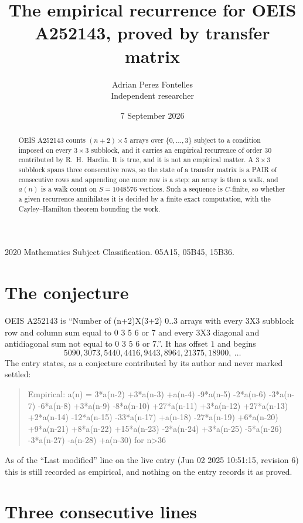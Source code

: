 \documentclass[11pt,a4paper]{article}
\title{The empirical recurrence for OEIS A252143, proved by transfer matrix}
\author{Adrian Perez Fontelles\\ \small Independent researcher}
\date{7 September 2026}
\theoremstyle{plain}
\theoremstyle{definition}
\begin{document}
\maketitle

\begin{abstract}
OEIS A252143 counts $(n+2)\times5$ arrays over $\{0,\dots,3\}$ subject to a condition imposed on
every $3\times3$ subblock, and it carries an empirical recurrence of order $30$
contributed by R.~H.~Hardin. It is true, and it is not an empirical matter. A $3\times3$
subblock spans three consecutive rows, so the state of a transfer matrix is a PAIR of
consecutive rows and appending one more row is a step; an array is then a walk, and
$a(n)$ is a walk count on $S=1048576$ vertices. Such a sequence is $C$-finite, so whether a given
recurrence annihilates it is decided by a finite exact computation, with the Cayley--Hamilton
theorem bounding the work.
\end{abstract}

\noindent\small 2020 Mathematics Subject Classification. 05A15, 05B45, 15B36.\normalsize

\section{The conjecture}

OEIS A252143 is ``Number of (n+2)X(3+2) 0..3 arrays with every 3X3 subblock row and column sum equal to 0 3 5 6 or 7 and every 3X3 diagonal and antidiagonal sum not equal to 0 3 5 6 or 7.''. It has offset $1$ and begins
\[
5090, 3073, 5440, 4416, 9443, 8964, 21375, 18900,\ \dots
\]
The entry states, as a conjecture contributed by its author and never marked settled:
\begin{quote}
Empirical: a(n) = 3*a(n-2) +3*a(n-3) +a(n-4) -9*a(n-5) -2*a(n-6) -3*a(n-7) -6*a(n-8) +3*a(n-9) -8*a(n-10) +27*a(n-11) +3*a(n-12) +27*a(n-13) +2*a(n-14) -12*a(n-15) -33*a(n-17) +a(n-18) -27*a(n-19) +6*a(n-20) +9*a(n-21) +8*a(n-22) +15*a(n-23) -2*a(n-24) +3*a(n-25) -5*a(n-26) -3*a(n-27) -a(n-28) +a(n-30) for n>36
\end{quote}
As of the ``Last modified'' line on the live entry (Jun 02 2025 10:51:15, revision 6) this is still
recorded as empirical, and nothing on the entry records it as proved.

\section{Three consecutive lines}
\end{document}
